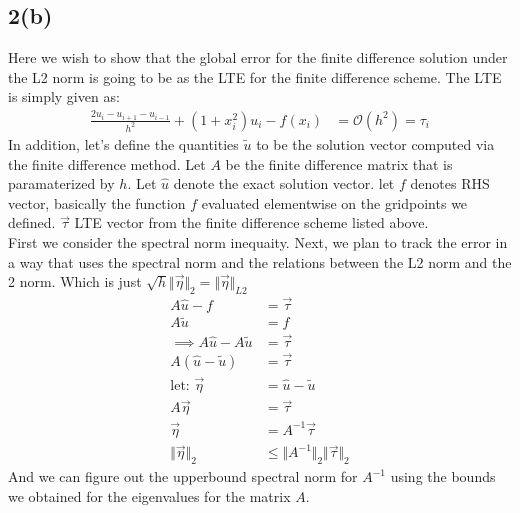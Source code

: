 \documentclass[]{article}
\begin{document}
    \subsection*{2(b)}
        Here we wish to show that the global error for the finite difference solution under the L2 norm is going to be as the LTE for the finite difference scheme. The LTE is simply given as: 
        \begin{align*}\tag{2.b.1}\label{eqn:2.b.1}
            \frac{2u_i - u_{i + 1} - u_{i - 1}}{h^2}
            + 
            (1 + x_i^2)u_i - f(x_i) &= \mathcal{O}(h^2) = \tau_i
        \end{align*}
        In addition, let's define the quantities $\tilde{u}$ to be the solution vector computed via the finite difference method. Let $A$ be the finite difference matrix that is paramaterized by $h$. Let $\hat{u}$ denote the exact solution vector. let $f$ denotes RHS vector, basically the function $f$ evaluated elementwise on the gridpoints we defined. $\vec{\tau}$ LTE vector from the finite difference scheme listed above. 
        \\
        First we consider the spectral norm inequaity. 
        Next, we plan to track the error in a way that uses the spectral norm and the relations between the L2 norm and the 2 norm. Which is just $\sqrt{h}\Vert \vec{\eta}\Vert_2 = \Vert \vec{\eta}\Vert_{L2}$
        \begin{align*}\tag{2.b.2}\label{eqn:2.b.2}
            A\hat{u} - f &= \vec{\tau} \\
            A\tilde{u} &= f
            \\
            \implies
            A\hat{u} - A\tilde{u} &= \vec{\tau}
            \\
            A(\hat{u} - \tilde{u}) &= \vec{\tau}
            \\
            \text{let: }\vec{\eta} &= \hat{u} - \tilde{u} 
            \\
            A\vec{\eta} &=\vec{\tau}
            \\
            \vec{\eta} &= A^{-1}\vec{\tau}
            \\
            \Vert \vec{\eta}\Vert_2 &\le 
            \Vert A^{-1}\Vert_2\Vert \vec{\tau}\Vert_2
        \end{align*}
        And we can figure out the upperbound spectral norm for $A^{-1}$ using the bounds we obtained for the eigenvalues for the matrix $A$. 
\end{document}
